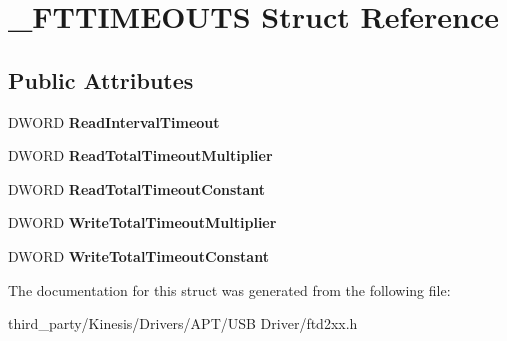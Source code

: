 \hypertarget{struct___f_t_t_i_m_e_o_u_t_s}{}\section{\+\_\+\+F\+T\+T\+I\+M\+E\+O\+U\+TS Struct Reference}
\label{struct___f_t_t_i_m_e_o_u_t_s}
\subsection*{Public Attributes}
\begin{DoxyCompactItemize}
\item 
D\+W\+O\+RD {\bfseries Read\+Interval\+Timeout}\hypertarget{struct___f_t_t_i_m_e_o_u_t_s_a0f9592f9863a3230933833750b67d467}{}\label{struct___f_t_t_i_m_e_o_u_t_s_a0f9592f9863a3230933833750b67d467}

\item 
D\+W\+O\+RD {\bfseries Read\+Total\+Timeout\+Multiplier}\hypertarget{struct___f_t_t_i_m_e_o_u_t_s_abec01499b73ce0bd194ca0628dbf58e8}{}\label{struct___f_t_t_i_m_e_o_u_t_s_abec01499b73ce0bd194ca0628dbf58e8}

\item 
D\+W\+O\+RD {\bfseries Read\+Total\+Timeout\+Constant}\hypertarget{struct___f_t_t_i_m_e_o_u_t_s_aa6478849c632565b01f91faca975cabe}{}\label{struct___f_t_t_i_m_e_o_u_t_s_aa6478849c632565b01f91faca975cabe}

\item 
D\+W\+O\+RD {\bfseries Write\+Total\+Timeout\+Multiplier}\hypertarget{struct___f_t_t_i_m_e_o_u_t_s_a1944986d4b6760a45db8ce1b58fa3688}{}\label{struct___f_t_t_i_m_e_o_u_t_s_a1944986d4b6760a45db8ce1b58fa3688}

\item 
D\+W\+O\+RD {\bfseries Write\+Total\+Timeout\+Constant}\hypertarget{struct___f_t_t_i_m_e_o_u_t_s_ac36dfafaf9522e0b041080242538d196}{}\label{struct___f_t_t_i_m_e_o_u_t_s_ac36dfafaf9522e0b041080242538d196}

\end{DoxyCompactItemize}


The documentation for this struct was generated from the following file\+:\begin{DoxyCompactItemize}
\item 
third\+\_\+party/\+Kinesis/\+Drivers/\+A\+P\+T/\+U\+S\+B Driver/ftd2xx.\+h\end{DoxyCompactItemize}
